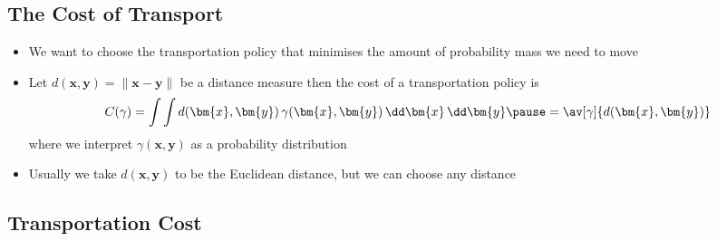 \begin{slide}
\section{The Cost of Transport}

\begin{PauseHighLight}
  \begin{itemize}
  \item We want to choose the transportation policy that minimises the
    amount of probability mass we need to move\pause
  \item Let $d(\bm{x},\bm{y})=\|\bm{x}-\bm{y}\|$ be a distance measure
    then the cost of a transportation policy is
    \begin{align*}
      C(\gamma) = \int \int d(\bm{x},\bm{y})\,\gamma(\bm{x},\bm{y}) \,
      \dd\bm{x}\,\dd\bm{y}\pause = \av[\gamma]{d(\bm{x},\bm{y})}
    \end{align*}
    where we interpret $\gamma(\bm{x},\bm{y})$ as a probability
    distribution\pauseb
  \item Usually we take $d(\bm{x},\bm{y})$ to be the Euclidean
    distance, but we can choose any distance\pause
  \end{itemize}
\end{PauseHighLight}

\end{slide}


\begin{slide}
\section[-2]{Transportation Cost}

\pb
\pause{}
\begin{center}
  \pause
\end{center}
\end{slide}



